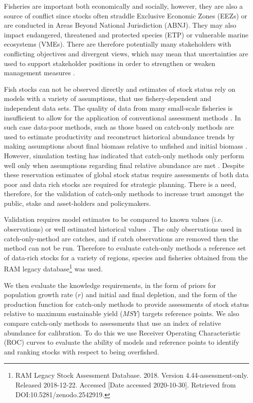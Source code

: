 Fisheries are important both economically and socially, however, they are also a source of conflict since stocks often straddle Exclusive Economic Zones (EEZs) or are conducted in Areas Beyond National Jurisdiction (ABNJ). They may also impact endangered, threatened and protected species (ETP) or vulnerable marine ecosystems (VMEs). There are therefore potentially many stakeholders with  conflicting objectives and divergent views, which may mean that uncertainties are used to support stakeholder positions in order to strengthen or weaken management measures \citep{fromentin2014spectre}.

Fish stocks can not be observed directly and estimates of stock status rely on models with a variety of assumptions, that use fishery-dependent and independent data sets. The quality of data from many small-scale fisheries is insufficient to allow for the application of conventional assessment methods \citep[e.g.][]{dowling2008developing}. In such case data-poor methods, such as those based on catch-only methods are used to estimate productivity and reconstruct historical abundance trends by making assumptions about final biomass relative to unfished and initial biomass \citep[e.g.][]{thorson2012using,froese2017estimating,}. However, simulation testing has indicated that catch-only methods only perform well only when assumptions regarding final relative abundance are met \citep{wetzel2015evaluating}. Despite these reservation estimates of global stock status require assessments of both data poor and data rich stocks are required for strategic planning. There is a need, therefore, for the validation of catch-only methods to increase trust amongst the public, stake and asset-holders and policymakers. %

Validation requires model estimates to be compared to known values (i.e. observations) or well estimated historical values \citep{kell2021hindcast}. The only observations used in catch-only-method are catches, and if catch observations are removed then the method can not be run. Therefore to evaluate catch-only methods a reference set of data-rich stocks for a variety of regions, species and fisheries obtained from the RAM legacy database\footnote{RAM Legacy Stock Assessment Database. 2018. Version 4.44-assessment-only. Released 2018-12-22. Accessed [Date accessed 2020-10-30]. Retrieved from DOI:10.5281/zenodo.2542919.} was used. 

We then evaluate the knowledge requirements, in the form of priors for population growth rate ($r$) and initial and final depletion, and the form of the production function for catch-only methods to provide assessments of stock status relative to maximum sustainable yield ($MSY$) targets reference points. We also compare catch-only methods to assessments that use an index of relative abundance for calibration. To do this we use Receiver Operating Characteristic (ROC) curves to evaluate the ability of models and reference points to identify and ranking stocks with respect to being overfished. 

